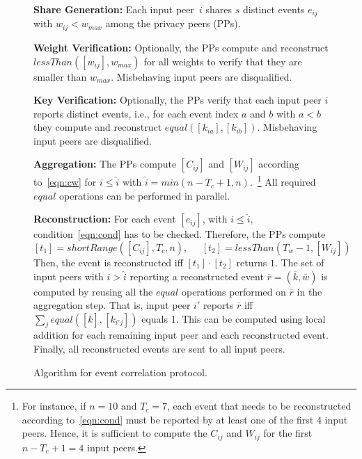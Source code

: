 \documentclass[letterpaper,11pt,onecolumn,titlepage]{article}
\begin{document}
\begin{figure*}[t]
	\begin{boxedminipage}{\textwidth}
		\begin{small}
		\begin{compactenum}
		
		\item \textbf{Share Generation:} Each input peer~$i$ shares $s$ distinct events $e_{ij}$ with $w_{ij} < w_{max}$ among the privacy peers (PPs).
		
		\item \textbf{Weight Verification:} Optionally, the PPs compute and reconstruct $lessThan([w_{ij}], w_{max})$ for all weights to verify that they are smaller  than $w_{max}$. Misbehaving input peers are disqualified.
		
		\item \textbf{Key Verification:} Optionally, the PPs verify that each input peer $i$ reports distinct events, i.e., for each event index $a$ and $b$ with $a<b$ they compute and reconstruct $equal([k_{ia}], [k_{ib}])$. Misbehaving input peers are disqualified.
		
		\item \textbf{Aggregation:} The PPs compute $[C_{ij}]$ and $[W_{ij}]$ according to~\eqref{eqn:cw} for $i \leq \hat{i}$ with $\hat{i}=min(n-T_c+1,n)$.~\footnote{For instance, if $n=10$ and $T_c=7$, each event that needs to be reconstructed according to~\eqref{eqn:cond} must be reported by at least one of the first 4 input peers. Hence, it is sufficient to compute the $C_{ij}$ and $W_{ij}$ for the first $n-T_c+1=4$ input peers.} All required $equal$ operations can be performed in parallel.
		\item \textbf{Reconstruction:} For each event $[e_{ij}]$, with $i \leq \hat{i}$, condition~\eqref{eqn:cond} has to be checked. Therefore, the PPs compute
		\begin{equation*}
		  {[t_1]} = shortRange([C_{ij}], T_c, n), \;\;\;\;\; {[t_2]} = lessThan(T_w-1, [W_{ij}])   
		\end{equation*}
		Then, the event is reconstructed iff $[t_1] \cdot [t_2]$ returns $1$. 
		The set of input peers with $i > \hat{i}$ reporting a reconstructed event $\overline{r}=(\overline{k},\overline{w})$ is computed by reusing all the $equal$ operations performed on $\overline{r}$ in the aggregation step. That is, input peer $i'$ reports $\overline{r}$ iff $\sum_{j}{equal([\overline{k}],[k_{i'j}])}$ equals 1. This can be computed using local addition for each remaining input peer and each reconstructed event. Finally, all reconstructed events are sent to all input peers.
		\end{compactenum}
		\end{small}
	\end{boxedminipage}
	\caption{Algorithm for event correlation protocol.}
	\label{box:eventcorrelation}
\end{figure*}
\end{document}
